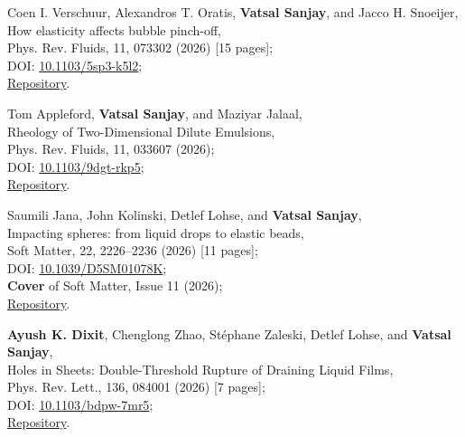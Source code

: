 \item Coen I. Verschuur, Alexandros T. Oratis, \textbf{Vatsal Sanjay}, and Jacco H. Snoeijer,\\
	How elasticity affects bubble pinch-off,\\
	Phys. Rev. Fluids, 11, 073302 (2026) [15 pages];\\
	\faFile\hspace{0.2em}DOI: \href{https://doi.org/10.1103/5sp3-k5l2}{10.1103/5sp3-k5l2};\\
	\faGithub\hspace{0.2em}\href{https://github.com/comphy-lab/ElasticPinchOff}{Repository}.

	\item Tom Appleford, \textbf{Vatsal Sanjay}, and Maziyar Jalaal,\\
	Rheology of Two-Dimensional Dilute Emulsions,\\
	Phys. Rev. Fluids, 11, 033607 (2026);\\
	\faFile\hspace{0.2em}DOI: \href{https://doi.org/10.1103/9dgt-rkp5}{10.1103/9dgt-rkp5};\\
	\faGithub\hspace{0.2em}\href{https://github.com/tappleford/droplet_under_shear_newtonian_2D}{Repository}.

	\item Saumili Jana, John Kolinski, Detlef Lohse, and \textbf{Vatsal Sanjay},\\
	Impacting spheres: from liquid drops to elastic beads,\\
	Soft Matter, 22, 2226--2236 (2026) [11 pages];\\
	\faFile\hspace{0.2em}DOI: \href{https://doi.org/10.1039/D5SM01078K}{10.1039/D5SM01078K};\\
	\faStar\hspace{0.2em}\textbf{Cover} of Soft Matter, Issue 11 (2026);\\
	\faGithub\hspace{0.2em}\href{https://github.com/comphy-lab/Soft-Sphere-Impacts}{Repository}.

	\item \textbf{Ayush K. Dixit}, Chenglong Zhao, St\'ephane Zaleski, Detlef Lohse, and \textbf{Vatsal Sanjay},\\
	Holes in Sheets: Double-Threshold Rupture of Draining Liquid Films,\\
	Phys. Rev. Lett., 136, 084001 (2026) [7 pages];\\
	\faFile\hspace{0.2em}DOI: \href{https://doi.org/10.1103/bdpw-7mr5}{10.1103/bdpw-7mr5};\\
	\faGithub\hspace{0.2em}\href{https://github.com/comphy-lab/HoleySheet}{Repository}.

